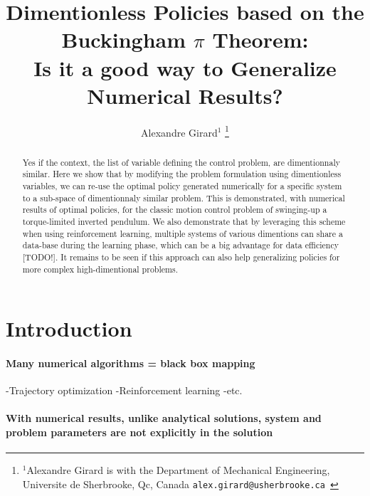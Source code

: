 

\title{\LARGE \bf
Dimentionless Policies based on the Buckingham $\pi$ Theorem: \\ 
Is it a good way to Generalize Numerical Results?
}


\author{Alexandre Girard$^{1}$%
\thanks{$^{1}$Alexandre Girard is with the Department of Mechanical Engineering, Universite de Sherbrooke, Qc, Canada {\tt\small  alex.girard@usherbrooke.ca }}%
}%


\maketitle
\thispagestyle{empty}
\pagestyle{empty}


\begin{abstract}
Yes if the context, the list of variable defining the control problem, are dimentionnaly similar. Here we show that by modifying the problem formulation using dimentionless variables, we can re-use the optimal policy generated numerically for a specific system to a sub-space of dimentionnaly similar problem. This is demonstrated, with numerical results of optimal policies, for the classic motion control problem of swinging-up a torque-limited inverted pendulum. We also demonstrate that by leveraging this scheme when using reinforcement learning, multiple systems of various dimentions can share a data-base during the learning phase, which can be a big advantage for data efficiency [TODO!]. It remains to be seen if this approach can also help generalizing policies for more complex high-dimentional problems.
\end{abstract}

\section{Introduction}

\paragraph{Many numerical algorithms = black box mapping}
-Trajectory optimization
-Reinforcement learning
-etc.

\paragraph{With numerical results, unlike analytical solutions, system and problem parameters are not explicitly in the solution }

